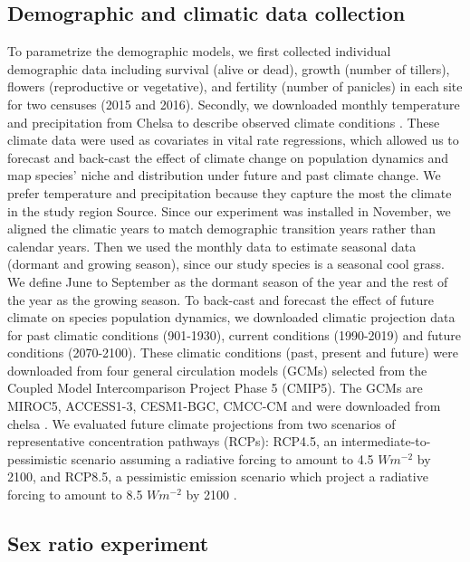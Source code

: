 \documentclass[11pt]{article}
\begin{document}
\subsection*{Demographic and climatic data collection}
To  parametrize the demographic models, we first collected individual demographic data including survival (alive or dead), growth (number of tillers), flowers (reproductive or vegetative), and fertility (number of panicles) in each site for two censuses (2015 and 2016). 
Secondly, we downloaded monthly temperature and precipitation from Chelsa to describe observed climate conditions \citep{karger2017climatologies}.
These climate data were used as covariates in vital rate regressions, which allowed us to forecast and back-cast the effect of climate change on population dynamics and map species’ niche and distribution under future and past climate change. 
We prefer temperature and precipitation because they capture the most the climate in the study region \colorbox{BurntOrange}{Source}. 
Since our experiment was installed in November, we aligned the climatic years to match demographic transition years rather than calendar years.
Then we used the monthly data to estimate seasonal data (dormant and growing season), since our study species is a seasonal cool grass. 
We define June to September as the dormant season of the year and the rest of the year as the growing season. 
To back-cast and forecast the effect of future climate on species population dynamics, we downloaded climatic projection data for past climatic conditions (901-1930), current conditions (1990-2019) and future conditions (2070-2100).
These climatic conditions (past, present and future) were downloaded from four general circulation models (GCMs) selected from the Coupled Model Intercomparison Project Phase 5 (CMIP5). 
The GCMs are MIROC5, ACCESS1-3, CESM1-BGC, CMCC-CM  and were downloaded from chelsa \citep{sanderson2015representative}.
We evaluated future climate projections from two scenarios of representative concentration pathways (RCPs): RCP4.5, an intermediate-to-pessimistic scenario assuming a radiative forcing to amount to 4.5 $W m^{-2}$ by 2100, and RCP8.5, a pessimistic emission scenario which project a radiative forcing to amount to 8.5 $W m^{-2}$ by 2100 \citep{thomson2011rcp4, schwalm2020rcp8}.

\subsection*{Sex ratio experiment}
\end{document}
